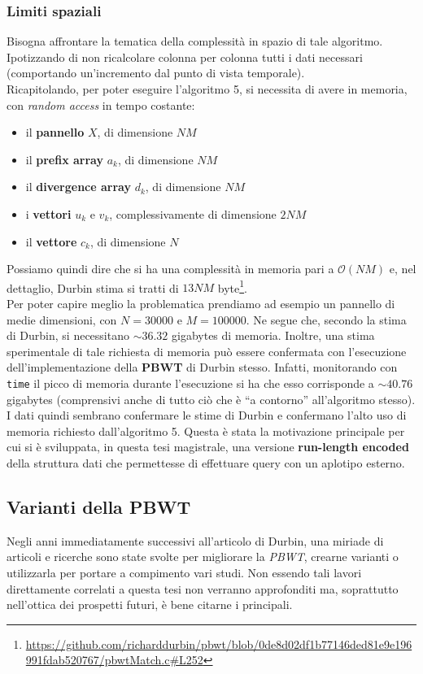 \subsubsection{Limiti spaziali}
Bisogna affrontare la tematica della complessità in spazio di tale
algoritmo. Ipotizzando di non ricalcolare colonna per colonna tutti i dati
necessari (comportando un'incremento dal punto di vista temporale).\\
Ricapitolando, per poter eseguire l'algoritmo 5, si necessita di avere in
memoria, con \textit{random access} in tempo costante:
\begin{itemize}
  \item il \textbf{pannello} $X$, di dimensione $NM$
  \item il \textbf{prefix array} $a_k$, di dimensione $NM$
  \item il \textbf{divergence array} $d_k$, di dimensione $NM$
  \item i \textbf{vettori} $u_k$ e $v_k$, complessivamente di dimensione $2NM$
  \item il \textbf{vettore} $c_k$, di dimensione $N$
\end{itemize}
Possiamo quindi dire che si ha una complessità in memoria pari a
$\mathcal{O}(NM)$ e, nel dettaglio, Durbin stima si tratti di $13NM$
byte\footnote{\url{https://github.com/richarddurbin/pbwt/blob/0de8d02df1b77146ded81e9e196991fdab520767/pbwtMatch.c\#L252}}.\\
Per poter capire meglio la problematica prendiamo ad esempio un pannello di
medie dimensioni, con $N=30000$ e $M=100000$. Ne segue che, secondo la stima di
Durbin, si necessitano $\sim 36.32$ gigabytes di memoria. Inoltre, una stima
sperimentale di tale richiesta di memoria può essere confermata con l'esecuzione
dell'implementazione della \textbf{PBWT} di Durbin stesso. Infatti, monitorando
con \texttt{time} il picco di memoria durante l'esecuzione si ha che esso
corrisponde a $\sim 40.76$ gigabytes (comprensivi anche di tutto ciò che è ``a
contorno'' all'algoritmo stesso). I dati quindi sembrano confermare le stime di
Durbin e confermano l'alto uso di memoria richiesto dall'algoritmo 5. Questa è
stata la motivazione principale per cui si è sviluppata, in questa tesi
magistrale, una versione \textbf{run-length encoded} della struttura dati che
permettesse di effettuare query con un aplotipo esterno.
\subsection{Varianti della PBWT}
Negli anni immediatamente successivi all'articolo di Durbin, una miriade di
articoli e ricerche sono state svolte per migliorare la \textit{PBWT}, crearne
varianti o utilizzarla per portare a compimento vari studi. Non essendo tali
lavori direttamente correlati a questa tesi non 
verranno approfonditi ma, soprattutto nell'ottica dei prospetti futuri, è bene
citarne i principali.
